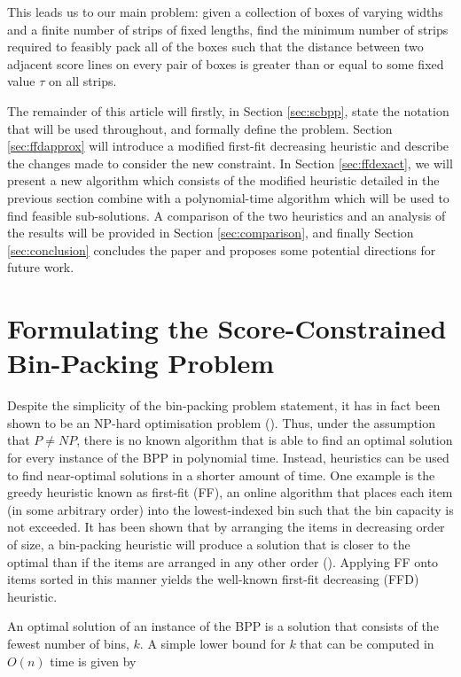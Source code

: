 \documentclass[oribibl]{llncs}
\begin{document}
This leads us to our main problem: given a collection of boxes of varying widths and a finite number of strips of fixed lengths, find the minimum number of strips required to feasibly pack all of the boxes such that the distance between two adjacent score lines on every pair of boxes is greater than or equal to some fixed value $\tau$ on all strips.

The remainder of this article will firstly, in Section \ref{sec:scbpp}, state the notation that will be used throughout, and formally define the problem. Section \ref{sec:ffdapprox} will introduce a modified first-fit decreasing heuristic and describe the changes made to consider the new constraint. In Section \ref{sec:ffdexact}, we will present a new algorithm which consists of the modified heuristic detailed in the previous section combine with a polynomial-time algorithm which will be used to find feasible sub-solutions. A comparison of the two heuristics and an analysis of the results will be provided in Section \ref{sec:comparison}, and finally Section \ref{sec:conclusion} concludes the paper and proposes some potential directions for future work.

\section{Formulating the Score-Constrained Bin-Packing Problem}

Despite the simplicity of the bin-packing problem statement, it has in fact been shown to be an NP-hard optimisation problem (\citealp{garey1979}). Thus, under the assumption that $P \neq NP$, there is no known algorithm that is able to find an optimal solution for every instance of the BPP in polynomial time. Instead, heuristics can be used to find near-optimal solutions in a shorter amount of time. One example is the greedy heuristic known as first-fit (FF), an online algorithm that places each item (in some arbitrary order) into the lowest-indexed bin such that the bin capacity is not exceeded. It has been shown that by arranging the items in decreasing order of size, a bin-packing heuristic will produce a solution that is closer to the optimal than if the items are arranged in any other order (\citealp{johnson1974fast}). Applying FF onto items sorted in this manner yields the well-known first-fit decreasing (FFD) heuristic.


An optimal solution of an instance of the BPP is a solution that consists of the fewest number of bins, $k$. A simple lower bound for $k$ that can be computed in $O(n)$ time is given by
\end{document}
